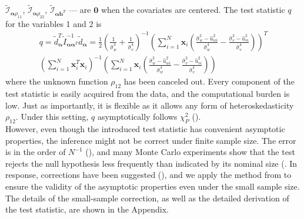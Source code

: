 \documentclass[aap,authoryear, preprint]{imsart}
\numberwithin{equation}{section}
\theoremstyle{plain}
\begin{document}
$\tilde{\mathcal{I}}_{\bm{\alpha}\rho_{11}}$,
$\tilde{\mathcal{I}}_{\bm{\alpha}\rho_{22}}$,
$\tilde{\mathcal{I}}_{\bm{\alpha}\bm{b}^T}$ --- are $\bm{0}$ when the covariates are centered. The test statistic $q$ for the variables 1 and 2 is
\begin{equation}
    \begin{multlined}
    q = \tilde{d}_{\bm{\alpha}}^T \tilde{I}_{\bm{\alpha}\bm{\alpha}^T}^{-1}
    \tilde{d}_{\bm{\alpha}}
    =\frac{1}{2}\left( \frac{1}{\hat{\sigma}_w^4}+\frac{1}{\hat{\sigma}_v^4}\right)^{-1}
\left(\sum_{i=1}^{N} \bm{x}_{i} 
\left(
\frac{\hat{\sigma}_w^2-\hat{u}_{wi}^2}{\hat{\sigma}_w^4}- \frac{\hat{\sigma}_v^2-\hat{u}_{vi}^2}{\hat{\sigma}_v^4}
\right)
\right)^T \\
\left( \sum_{i=1}^{N} \bm{x}_i^T \bm{x}_i \right)^{-1}
\left(
\sum_{i=1}^{N} \bm{x}_{i} 
\left(
\frac{\hat{\sigma}_w^2-\hat{u}_{wi}^2}{\hat{\sigma}_w^4}- \frac{\hat{\sigma}_v^2-\hat{u}_{vi}^2}{\hat{\sigma}_v^4}
\right)
\right)
    \end{multlined}
    \label{eq:q}
\end{equation}
where the unknown function $\rho_{12}$ has been canceled out. Every component of the test statistic is easily acquired from the data, and the computational burden is low. Just as importantly, it is flexible as it allows any form of heteroskedasticity $\rho_{12}$. Under this setting, $q$ asymptotically follows $\chi_{P}^2$ (\cite{breusch1979simple}).\\

However, even though the introduced test statistic has convenient asymptotic properties, the inference might not be correct under finite sample size. The error is in the order of $N^{-1}$ (\cite{harris1985asymptotic}), and many Monte Carlo experiments show that the test rejects the null hypothesis less frequently than indicated by its nominal size (\cite{ godfrey1978testing, griffiths1986monte}. In response, corrections have been suggested (\cite{cribari2001monotonic, harris1985asymptotic}), and we apply the method from \cite{honda1988size} to ensure the validity of the asymptotic properties even under the small sample size. The details of the small-sample correction, as well as the detailed derivation of the test statistic, are shown in the Appendix.\\
\end{document}
